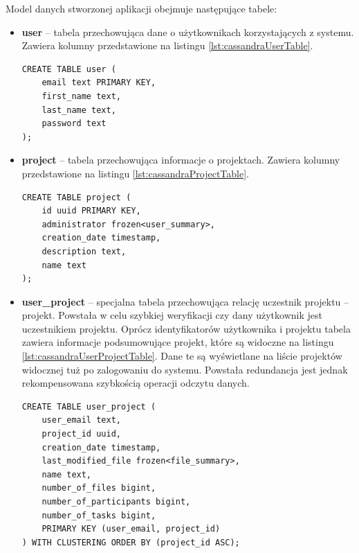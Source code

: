 Model danych stworzonej aplikacji obejmuje następujące tabele:
\begin{itemize}
    \item \textbf{user} -- tabela przechowująca dane o użytkownikach korzystających z systemu.
    Zawiera kolumny przedstawione na listingu \ref{lst:cassandraUserTable}.

    \begin{minipage}{\linewidth}
    \begin{lstlisting}[language=CQL,caption={Definicja tabeli \textit{user}},label={lst:cassandraUserTable}]
CREATE TABLE user (
    email text PRIMARY KEY,
    first_name text,
    last_name text,
    password text
);
    \end{lstlisting}
    \end{minipage}

    \item \textbf{project} -- tabela przechowująca informacje o projektach.
    Zawiera kolumny przedstawione na listingu \ref{lst:cassandraProjectTable}.
    
    \begin{minipage}{\linewidth}
    \begin{lstlisting}[language=CQL,caption={Definicja tabeli \textit{project}},label={lst:cassandraProjectTable}]
CREATE TABLE project (
    id uuid PRIMARY KEY,
    administrator frozen<user_summary>,
    creation_date timestamp,
    description text,
    name text
);
    \end{lstlisting}
    \end{minipage}
    
    \item \textbf{user\_project} -- specjalna tabela przechowująca relację uczestnik projektu -- projekt. 
    Powstała w celu szybkiej weryfikacji czy dany użytkownik jest uczestnikiem projektu.
    Oprócz identyfikatorów użytkownika i projektu tabela zawiera informacje podsumowujące projekt, które są widoczne na listingu \ref{lst:cassandraUserProjectTable}. 
    Dane te są wyświetlane na liście projektów widocznej tuż po zalogowaniu do systemu.
    Powstała redundancja jest jednak rekompensowana szybkością operacji odczytu danych.
    
    \begin{minipage}{\linewidth}
    \begin{lstlisting}[language=CQL,caption={Definicja tabeli \textit{user\_project}},label={lst:cassandraUserProjectTable}]
CREATE TABLE user_project (
    user_email text,
    project_id uuid,
    creation_date timestamp,
    last_modified_file frozen<file_summary>,
    name text,
    number_of_files bigint,
    number_of_participants bigint,
    number_of_tasks bigint,
    PRIMARY KEY (user_email, project_id)
) WITH CLUSTERING ORDER BY (project_id ASC);
    \end{lstlisting}
    \end{minipage}
    

\end{itemize}
